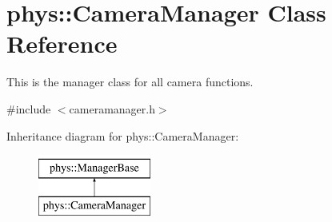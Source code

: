 \hypertarget{classphys_1_1CameraManager}{
\section{phys::CameraManager Class Reference}
\label{d9/d91/classphys_1_1CameraManager}
}


This is the manager class for all camera functions.  




{\ttfamily \#include $<$cameramanager.h$>$}

Inheritance diagram for phys::CameraManager:\begin{figure}[H]
\begin{center}
\leavevmode
\includegraphics[height=2cm]{d9/d91/classphys_1_1CameraManager}
\end{center}
\end{figure}
